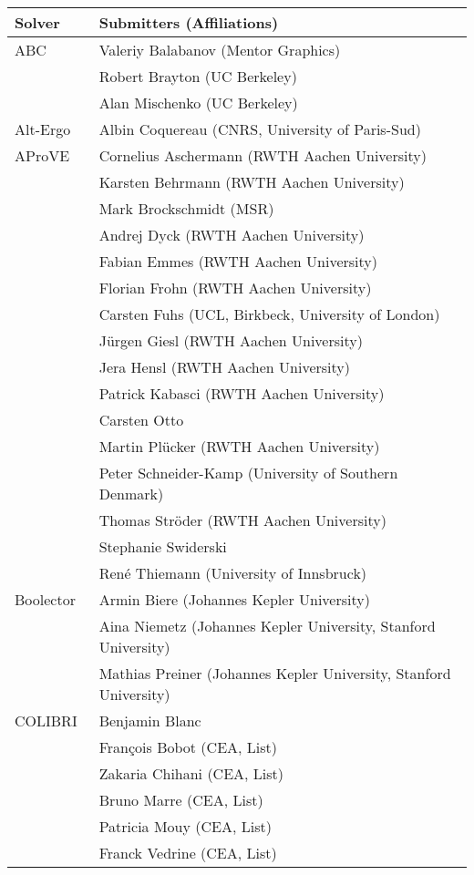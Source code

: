 \begin{longtable}{lp{11.5cm}}
  \toprule
  Solver & Submitters (Affiliations)\\
  \midrule
  ABC~\cite{DBLP:conf/cav/BraytonM10}
  & Valeriy Balabanov (Mentor Graphics) \\
  & Robert Brayton (UC Berkeley) \\
  & Alan Mischenko (UC Berkeley)
  \\[1ex]

  Alt-Ergo~\cite{conchon:hal-01960203}
  & Albin Coquereau (CNRS, University of Paris-Sud)
  \\[1ex]

  AProVE~\cite{DBLP:journals/jar/GieslABEFFHOPSS17}
  & Cornelius Aschermann (RWTH Aachen University) \\
  & Karsten Behrmann (RWTH Aachen University) \\
  & Mark Brockschmidt (MSR) \\
  & Andrej Dyck (RWTH Aachen University) \\
  & Fabian Emmes (RWTH Aachen University) \\
  & Florian Frohn (RWTH Aachen University) \\
  & Carsten Fuhs (UCL, Birkbeck, University of London) \\
  & J\"urgen Giesl (RWTH Aachen University) \\
  & Jera Hensl (RWTH Aachen University) \\
  & Patrick Kabasci (RWTH Aachen University) \\
  & Carsten Otto \\
  & Martin Pl\"ucker (RWTH Aachen University) \\
  & Peter Schneider-Kamp (University of Southern Denmark) \\
  & Thomas Str\"oder (RWTH Aachen University) \\
  & Stephanie Swiderski \\
  & Ren\'e Thiemann (University of Innsbruck)
  \\[1ex]

  Boolector~\cite{DBLP:conf/cav/NiemetzPWB18}
  & Armin Biere (Johannes Kepler University) \\
  & Aina Niemetz (Johannes Kepler University, Stanford University) \\
  & Mathias Preiner (Johannes Kepler University, Stanford University)
  \\[1ex]

  COLIBRI~\cite{colibri}
  & Benjamin Blanc \\
  & Fran\c{c}ois Bobot (CEA, List) \\
  & Zakaria Chihani (CEA, List) \\
  & Bruno Marre (CEA, List) \\
  & Patricia Mouy (CEA, List) \\
  & Franck Vedrine (CEA, List)
  \\[1ex]


\end{longtable}
